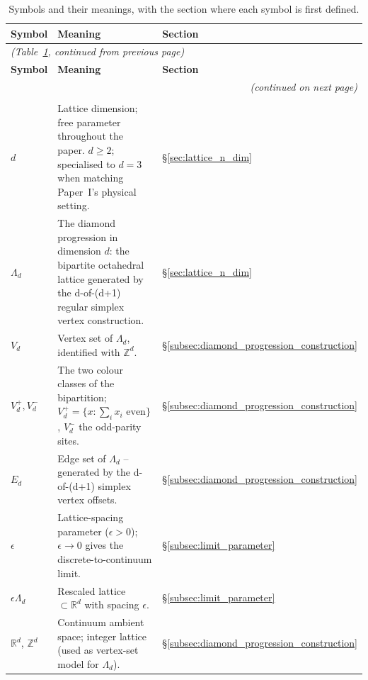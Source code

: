 
\label{sec:symbols}


{\small
\setlength{\tabcolsep}{6pt}
\renewcommand{\arraystretch}{1.10}
\begin{longtable}{@{}p{2.6cm}p{8.4cm}p{3.0cm}@{}}
\caption{\small Symbols and their meanings, with the section where
each symbol is first defined.}
\label{tab:symbols} \\
\hline
\textbf{Symbol} & \textbf{Meaning} & \textbf{Section} \\
\hline
\endfirsthead

\multicolumn{3}{l}{\textit{(Table~\ref{tab:symbols}, continued from previous page)}} \\
\hline
\textbf{Symbol} & \textbf{Meaning} & \textbf{Section} \\
\hline
\endhead

\hline
\multicolumn{3}{r}{\textit{(continued on next page)}} \\
\endfoot

\hline
\endlastfoot

\multicolumn{3}{@{}l}{\textit{Lattice and ambient spaces}} \\
$d$
    & Lattice dimension; free parameter throughout the paper.  $d \geq 2$; specialised to $d = 3$ when matching Paper~I's physical setting.
    & \S\ref{sec:lattice_n_dim} \\
$\Lambda_d$
    & The diamond progression in dimension $d$: the bipartite octahedral lattice generated by the d-of-(d+1) regular simplex vertex construction.
    & \S\ref{sec:lattice_n_dim} \\
$V_d$
    & Vertex set of $\Lambda_d$, identified with $\mathbb{Z}^d$.
    & \S\ref{subsec:diamond_progression_construction} \\
$V_d^+, V_d^-$
    & The two colour classes of the bipartition; $V_d^+ = \{x : \sum_i x_i \text{ even}\}$, $V_d^-$ the odd-parity sites.
    & \S\ref{subsec:diamond_progression_construction} \\
$E_d$
    & Edge set of $\Lambda_d$ -- generated by the d-of-(d+1) simplex vertex offsets.
    & \S\ref{subsec:diamond_progression_construction} \\
$\epsilon$
    & Lattice-spacing parameter ($\epsilon > 0$); $\epsilon \to 0$ gives the discrete-to-continuum limit.
    & \S\ref{subsec:limit_parameter} \\
$\epsilon \Lambda_d$
    & Rescaled lattice $\subset \mathbb{R}^d$ with spacing $\epsilon$.
    & \S\ref{subsec:limit_parameter} \\
$\mathbb{R}^d$, $\mathbb{Z}^d$
    & Continuum ambient space; integer lattice (used as vertex-set model for $\Lambda_d$).
    & \S\ref{subsec:diamond_progression_construction} \\


\end{longtable}}
